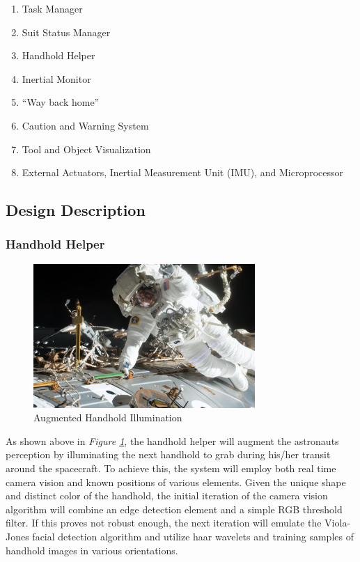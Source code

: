 \documentclass{article}
\let\Oldsubsection\subsection
\renewcommand{\subsection}{\FloatBarrier\Oldsubsection}
\let\Oldsubsubsection\subsubsection
\renewcommand{\subsubsection}{\FloatBarrier\Oldsubsubsection}
\begin{document}
\begin{enumerate}
\item Task Manager
\item Suit Status Manager
\item Handhold Helper
\item Inertial Monitor
\item “Way back home”
\item Caution and Warning System
\item Tool and Object Visualization
\item External Actuators, Inertial Measurement Unit (IMU), and Microprocessor
\end{enumerate}


\subsection{Design Description}

\subsubsection{Handhold Helper}

\begin{figure}[!htb]
  \centering
  \includegraphics[width=0.75\textwidth]{assets/markedhandrail.png}
  \caption{Augmented Handhold Illumination}
  \label{fig:markedhandrail}
\end{figure}

As shown above in \textit{Figure \ref{fig:markedhandrail}}, the handhold helper will augment the astronauts perception by illuminating the next handhold to grab during his/her transit around the spacecraft. To achieve this, the system will employ both real time camera vision and known positions of various elements. Given the unique shape and distinct color of the handhold, the initial iteration of the camera vision algorithm will combine an edge detection element and a simple RGB threshold filter. If this proves not robust enough, the next iteration will emulate the Viola-Jones facial detection algorithm and utilize haar wavelets and training samples of handhold images in various orientations.
\end{document}
